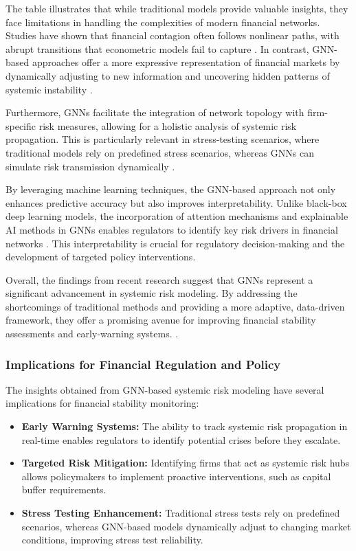 \documentclass[preprint,12pt,authoryear]{elsarticle}
\begin{document}
The table illustrates that while traditional models provide valuable insights, they face limitations in handling the complexities of modern financial networks. Studies have shown that financial contagion often follows nonlinear paths, with abrupt transitions that econometric models fail to capture \cite{acemoglu2015systemic}. In contrast, GNN-based approaches offer a more expressive representation of financial markets by dynamically adjusting to new information and uncovering hidden patterns of systemic instability \cite{das2020matrix}.  

Furthermore, GNNs facilitate the integration of network topology with firm-specific risk measures, allowing for a holistic analysis of systemic risk propagation. This is particularly relevant in stress-testing scenarios, where traditional models rely on predefined stress scenarios, whereas GNNs can simulate risk transmission dynamically \cite{bostanci2020assessing}.  

By leveraging machine learning techniques, the GNN-based approach not only enhances predictive accuracy but also improves interpretability. Unlike black-box deep learning models, the incorporation of attention mechanisms and explainable AI methods in GNNs enables regulators to identify key risk drivers in financial networks \cite{soramaki2007topology}. This interpretability is crucial for regulatory decision-making and the development of targeted policy interventions.  

Overall, the findings from recent research suggest that GNNs represent a significant advancement in systemic risk modeling. By addressing the shortcomings of traditional methods and providing a more adaptive, data-driven framework, they offer a promising avenue for improving financial stability assessments and early-warning systems.
.

\subsubsection{Implications for Financial Regulation and Policy}  

The insights obtained from GNN-based systemic risk modeling have several implications for financial stability monitoring:
\begin{itemize}
    \item \textbf{Early Warning Systems:} The ability to track systemic risk propagation in real-time enables regulators to identify potential crises before they escalate.
    \item \textbf{Targeted Risk Mitigation:} Identifying firms that act as systemic risk hubs allows policymakers to implement proactive interventions, such as capital buffer requirements.
    \item \textbf{Stress Testing Enhancement:} Traditional stress tests rely on predefined scenarios, whereas GNN-based models dynamically adjust to changing market conditions, improving stress test reliability.
\end{itemize}
\end{document}
